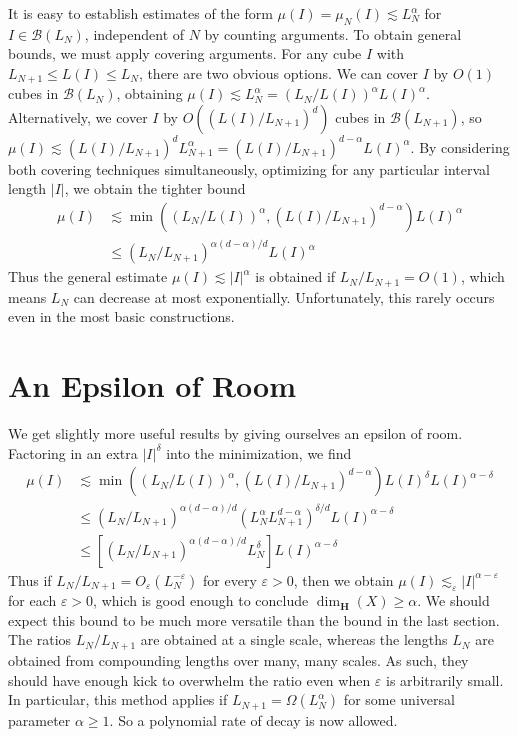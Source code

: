 \documentclass{report}
\theoremstyle{plain}
\theoremstyle{plain}
\begin{document}
It is easy to establish estimates of the form $\mu(I) = \mu_N(I) \lesssim L_N^\alpha$ for $I \in \mathcal{B}(L_N)$, independent of $N$ by counting arguments. To obtain general bounds, we must apply covering arguments. For any cube $I$ with $L_{N+1} \leq L(I) \leq L_N$, there are two obvious options. We can cover $I$ by $O(1)$ cubes in $\mathcal{B}(L_N)$, obtaining $\mu(I) \lesssim L_N^\alpha = (L_N / L(I))^\alpha L(I)^\alpha$. Alternatively, we cover $I$ by $O((L(I) / L_{N+1})^d)$ cubes in $\mathcal{B}(L_{N+1})$, so $\mu(I) \lesssim (L(I) / L_{N+1})^d L_{N+1}^\alpha = (L(I) / L_{N+1})^{d - \alpha} L(I)^\alpha$. By considering both covering techniques simultaneously, optimizing for any particular interval length $|I|$, we obtain the tighter bound
%
\begin{align*}
    \mu(I) &\lesssim \min\left( (L_N/L(I))^\alpha, (L(I)/L_{N+1})^{d - \alpha} \right) L(I)^\alpha\\
    &\leq (L_N/L_{N+1})^{\alpha(d - \alpha)/d} L(I)^\alpha
\end{align*}
%
Thus the general estimate $\mu(I) \lesssim |I|^\alpha$ is obtained if $L_N/L_{N+1} = O(1)$, which means $L_N$ can decrease at most exponentially. Unfortunately, this rarely occurs even in the most basic constructions.

\section{An Epsilon of Room}

We get slightly more useful results by giving ourselves an epsilon of room. Factoring in an extra $|I|^\delta$ into the minimization, we find
%
\begin{align*}
    \mu(I) &\lesssim \min((L_N/L(I))^\alpha, (L(I)/L_{N+1})^{d-\alpha}) L(I)^\delta L(I)^{\alpha - \delta}\\
    &\leq (L_N/L_{N+1})^{\alpha(d-\alpha)/d} (L_N^\alpha L_{N+1}^{d-\alpha})^{\delta/d} L(I)^{\alpha - \delta}\\
    &\leq \left[ (L_N/L_{N+1})^{\alpha(d-\alpha)/d} L_N^\delta \right] L(I)^{\alpha - \delta}
\end{align*}
%
Thus if $L_N/L_{N+1} = O_\varepsilon(L_N^{- \varepsilon})$ for every $\varepsilon > 0$, then we obtain $\mu(I) \lesssim_\varepsilon |I|^{\alpha - \varepsilon}$ for each $\varepsilon > 0$, which is good enough to conclude $\dim_{\mathbf{H}}(X) \geq \alpha$. We should expect this bound to be much more versatile than the bound in the last section. The ratios $L_N/L_{N+1}$ are obtained at a single scale, whereas the lengths $L_N$ are obtained from compounding lengths over many, many scales. As such, they should have enough kick to overwhelm the ratio even when $\varepsilon$ is arbitrarily small. In particular, this method applies if $L_{N+1} = \Omega(L_N^\alpha)$ for some universal parameter $\alpha \geq 1$. So a polynomial rate of decay is now allowed.
\end{document}
